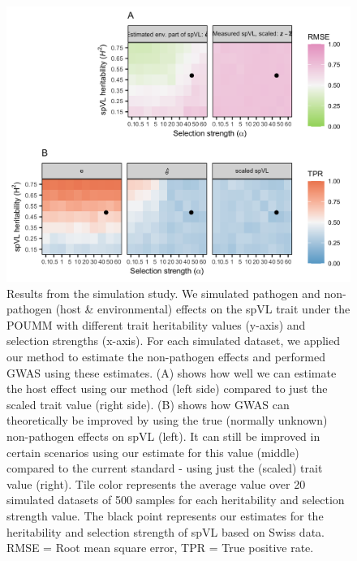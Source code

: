 \documentclass[]{article}
\begin{document}
\begin{doublespace}
\begin{figure}[H]
	\begin{center}
		\includegraphics[width=0.75\linewidth]{figures/simulation_results}
		\caption{Results from the simulation study. We simulated pathogen and non-pathogen (host \& environmental) effects on the spVL trait under the POUMM with different trait heritability values (y-axis) and selection strengths (x-axis). For each simulated dataset, we applied our method to estimate the non-pathogen effects and performed GWAS using these estimates. (A) shows how well we can estimate the host effect using our method (left side) compared to just the scaled trait value (right side). (B) shows how GWAS can theoretically be improved by using the true (normally unknown) non-pathogen effects on spVL (left). It can still be improved in certain scenarios using our estimate for this value (middle) compared to the current standard - using just the (scaled) trait value (right). Tile color represents the average value over 20 simulated datasets of 500 samples for each heritability and selection strength value. The black point represents our estimates for the heritability and selection strength of spVL based on Swiss data. RMSE = Root mean square error, TPR = True positive rate.}
		\label{fig:simulationResults}
	\end{center}
\end{figure}


\end{doublespace}
\end{document}

